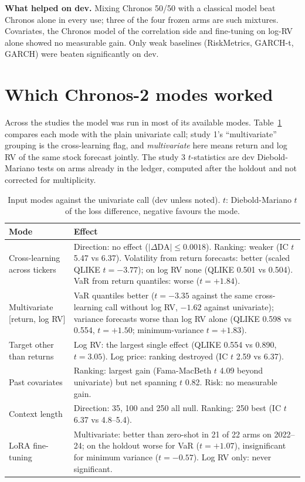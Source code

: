 \documentclass[11pt]{article}
\begin{document}
\textbf{What helped on dev.} Mixing Chronos 50/50 with a classical model beat Chronos alone in every use;
three of the four frozen arms are such mixtures. Covariates, the Chronos model of the correlation side and
fine-tuning on log-RV alone showed no measurable gain. Only weak baselines (RiskMetrics, GARCH-t, GARCH) were
beaten significantly on dev.

\section{Which Chronos-2 modes worked}\label{sec:modes}

Across the studies the model was run in most of its available modes. Table~\ref{tab:modes} compares each mode
with the plain univariate call; study 1's ``multivariate'' grouping is the cross-learning flag, and
\emph{multivariate} here means return and log RV of the same stock forecast jointly. The study 3 $t$-statistics
are dev Diebold-Mariano tests on arms already in the ledger, computed after the holdout and not corrected for
multiplicity.

\begin{table}[!htbp]
  \centering\small
  \caption{Input modes against the univariate call (dev unless noted). $t$: Diebold-Mariano $t$ of the loss
  difference, negative favours the mode.}
  \label{tab:modes}
  \begin{tabularx}{\textwidth}{lX}
    \toprule
    Mode & Effect \\
    \midrule
    Cross-learning across tickers & Direction: no effect ($|\Delta\text{DA}| \le 0.0018$). Ranking: weaker (IC $t$
      5.47 vs 6.37). Volatility from return forecasts: better (scaled QLIKE $t = -3.77$); on log RV none (QLIKE
      0.501 vs 0.504). VaR from return quantiles: worse ($t = +1.84$). \\
    Multivariate [return, log RV] & VaR quantiles better ($t = -3.35$ against the same cross-learning call
      without log RV, $-1.62$ against univariate); variance forecasts worse than log RV alone (QLIKE 0.598 vs
      0.554, $t = +1.50$; minimum-variance $t = +1.83$). \\
    Target other than returns & Log RV: the largest single effect (QLIKE 0.554 vs 0.890, $t = 3.05$). Log price:
      ranking destroyed (IC $t$ 2.59 vs 6.37). \\
    Past covariates & Ranking: largest gain (Fama-MacBeth $t$ 4.09 beyond univariate) but net spanning $t$ 0.82.
      Risk: no measurable gain. \\
    Context length & Direction: 35, 100 and 250 all null. Ranking: 250 best (IC $t$ 6.37 vs 4.8--5.4). \\
    LoRA fine-tuning & Multivariate: better than zero-shot in 21 of 22 arms on 2022--24; on the holdout worse for
      VaR ($t = +1.07$), insignificant for minimum variance ($t = -0.57$). Log RV only: never significant. \\
    \bottomrule
  \end{tabularx}
\end{table}
\end{document}

